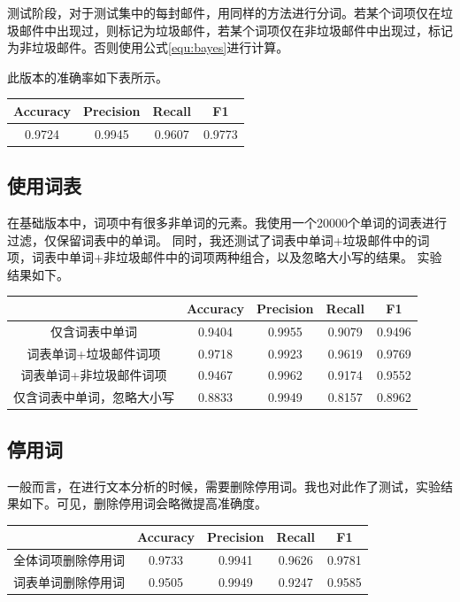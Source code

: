 \documentclass{article}
\begin{document}
测试阶段，对于测试集中的每封邮件，用同样的方法进行分词。若某个词项仅在垃圾邮件中出现过，则标记为垃圾邮件，若某个词项仅在非垃圾邮件中出现过，标记为非垃圾邮件。否则使用公式\ref{equ:bayes}进行计算。

此版本的准确率如下表所示。
\begin{table}[h]
\center
\label{tab:naive}
\begin{tabular}[]{|c|c|c|c|}
\hline
Accuracy & Precision & Recall & F1 \\ \hline
 0.9724 & 0.9945 & 0.9607 & 0.9773 \\ \hline
\end{tabular}
\end{table}
\subsection{使用词表}
在基础版本中，词项中有很多非单词的元素。我使用一个20000个单词的词表进行过滤，仅保留词表中的单词。
同时，我还测试了词表中单词+垃圾邮件中的词项，词表中单词+非垃圾邮件中的词项两种组合，以及忽略大小写的结果。
实验结果如下。
\begin{table}[h]
\center
\label{tab:wordlist}
\begin{tabular}[]{|c|c|c|c|c|}
\hline
& Accuracy & Precision & Recall & F1 \\ \hline
仅含词表中单词 & 0.9404 & 0.9955 & 0.9079 & 0.9496 \\ \hline
词表单词+垃圾邮件词项 & 0.9718 & 0.9923 & 0.9619 & 0.9769 \\ \hline
词表单词+非垃圾邮件词项 & 0.9467 & 0.9962 & 0.9174 & 0.9552 \\ \hline
仅含词表中单词，忽略大小写 & 0.8833 & 0.9949 & 0.8157 & 0.8962 \\ \hline
\end{tabular}
\end{table}
\subsection{停用词}
一般而言，在进行文本分析的时候，需要删除停用词。我也对此作了测试，实验结果如下。可见，删除停用词会略微提高准确度。
\begin{table}[h]
\center
\label{tab:stopwords}
\begin{tabular}[]{|c|c|c|c|c|}
\hline
& Accuracy & Precision & Recall & F1 \\ \hline
全体词项删除停用词 & 0.9733 & 0.9941 & 0.9626 & 0.9781 \\ \hline
词表单词删除停用词 & 0.9505 & 0.9949 & 0.9247 & 0.9585 \\ \hline
\end{tabular}
\end{table}
\newpage
\end{document}

